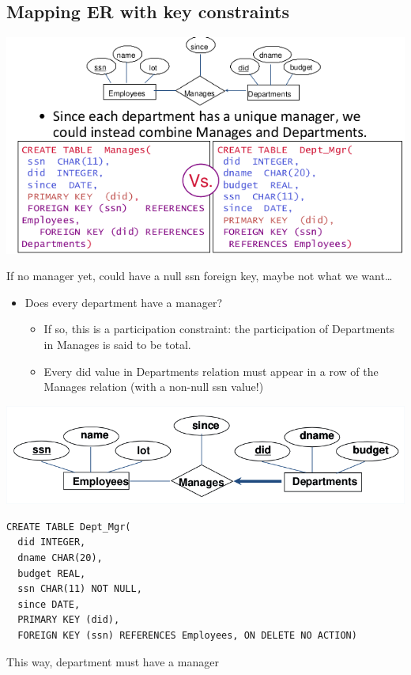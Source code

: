 \documentclass[11pt]{article}
\begin{document}
\subsection{Mapping ER with key constraints}
\label{sec:orgc1c2b62}
\begin{center}
\includegraphics[width=.9\linewidth]{files/Lecture 3/screenshot_2017-03-06_11-36-30.png}
\end{center}
If no manager yet, could have a null ssn foreign key, maybe not what we want\ldots{}
\begin{itemize}
\item Does every department have a manager?
\begin{itemize}
\item If so, this is a participation constraint: the participation of Departments in Manages is said to be total.
\item Every did value in Departments relation must appear in a row of the Manages
relation (with a non-null ssn value!)
\end{itemize}
\end{itemize}
\begin{center}
\includegraphics[width=.9\linewidth]{files/Lecture 3/screenshot_2017-03-06_11-50-07.png}
\end{center}
\begin{verbatim}
CREATE TABLE Dept_Mgr(
  did INTEGER,
  dname CHAR(20),
  budget REAL,
  ssn CHAR(11) NOT NULL,
  since DATE,
  PRIMARY KEY (did),
  FOREIGN KEY (ssn) REFERENCES Employees, ON DELETE NO ACTION)
\end{verbatim}
This way, department must have a manager
\end{document}
